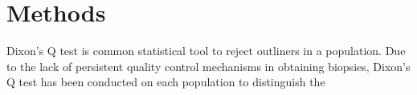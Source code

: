 \chapter{Methods}

Dixon's Q test is common statistical tool to reject outliners in a population. Due to the lack of persistent quality control mechanisms in obtaining biopsies, Dixon's Q test has been conducted on each population to distinguish the 